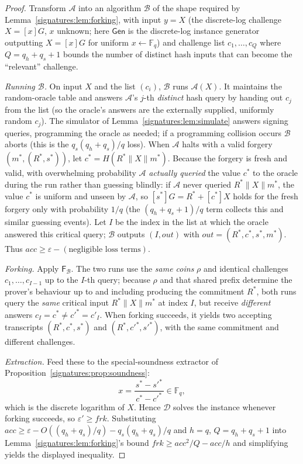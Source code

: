 \documentclass[11pt,a4paper]{article}
\theoremstyle{definition}
\theoremstyle{remark}
\newcommand{\Fq}{\ensuremath{\mathbb{F}_{q}}}
\begin{document}
\begin{proof}
Transform \(\mathcal{A}\) into an algorithm \(\mathcal{B}\) of the shape required by Lemma~\ref{signatures:lem:forking}, with input \(y = X\) (the discrete-log challenge \(X = [x]G\), \(x\) unknown; here \(\mathsf{Gen}\) is the discrete-log instance generator outputting \(X = [x]G\) for uniform \(x \gets \Fq\)) and challenge list \(c_1, \dots, c_Q\) where \(Q = q_h + q_s + 1\) bounds the number of distinct hash inputs that can become the ``relevant'' challenge.

\emph{Running \(\mathcal{B}\).} On input \(X\) and the list \((c_i)\), \(\mathcal{B}\) runs \(\mathcal{A}(X)\). It maintains the random-oracle table and answers \(\mathcal{A}\)'s \(j\)-th \emph{distinct} hash query by handing out \(c_j\) from the list (so the oracle's answers are the externally supplied, uniformly random \(c_j\)). The simulator of Lemma~\ref{signatures:lem:simulate} answers signing queries, programming the oracle as needed; if a programming collision occurs \(\mathcal{B}\) aborts (this is the \(q_s(q_h+q_s)/q\) loss). When \(\mathcal{A}\) halts with a valid forgery \((m^\ast, (R^\ast, s^\ast))\), let \(c^\ast = H(R^\ast\|X\|m^\ast)\). Because the forgery is fresh and valid, with overwhelming probability \(\mathcal{A}\) \emph{actually queried} the value \(c^\ast\) to the oracle during the run rather than guessing blindly: if \(\mathcal{A}\) never queried \(R^\ast\|X\|m^\ast\), the value \(c^\ast\) is uniform and unseen by \(\mathcal{A}\), so \([s^\ast]G = R^\ast + [c^\ast]X\) holds for the fresh forgery only with probability \(1/q\) (the \((q_h+q_s+1)/q\) term collects this and similar guessing events). Let \(I\) be the index in the list at which the oracle answered this critical query; \(\mathcal{B}\) outputs \((I, \mathit{out})\) with \(\mathit{out} = (R^\ast, c^\ast, s^\ast, m^\ast)\). Thus \(\mathit{acc} \ge \varepsilon - (\text{negligible loss terms})\).

\emph{Forking.} Apply \(\mathsf{F}_{\mathcal{B}}\). The two runs use the \emph{same coins} \(\rho\) and identical challenges \(c_1, \dots, c_{I-1}\) up to the \(I\)-th query; because \(\rho\) and that shared prefix determine the prover's behaviour up to and including producing the commitment \(R^\ast\), both runs query the \emph{same} critical input \(R^\ast\|X\|m^\ast\) at index \(I\), but receive \emph{different} answers \(c_I = c^\ast \ne c'^\ast = c'_I\). When forking succeeds, it yields two accepting transcripts \((R^\ast, c^\ast, s^\ast)\) and \((R^\ast, c'^\ast, s'^\ast)\), with the same commitment and different challenges.

\emph{Extraction.} Feed these to the special-soundness extractor of Proposition~\ref{signatures:prop:soundness}:
\[
  x = \frac{s^\ast - s'^\ast}{\,c^\ast - c'^\ast\,} \in \Fq,
\]
which is the discrete logarithm of \(X\). Hence \(\mathcal{D}\) solves the instance whenever forking succeeds, so \(\varepsilon' \ge \mathit{frk}\). Substituting \(\mathit{acc} \ge \varepsilon - O((q_h+q_s)/q) - q_s(q_h+q_s)/q\) and \(h = q\), \(Q = q_h+q_s+1\) into Lemma~\ref{signatures:lem:forking}'s bound \(\mathit{frk} \ge \mathit{acc}^2/Q - \mathit{acc}/h\) and simplifying yields the displayed inequality.
\end{proof}
\end{document}
